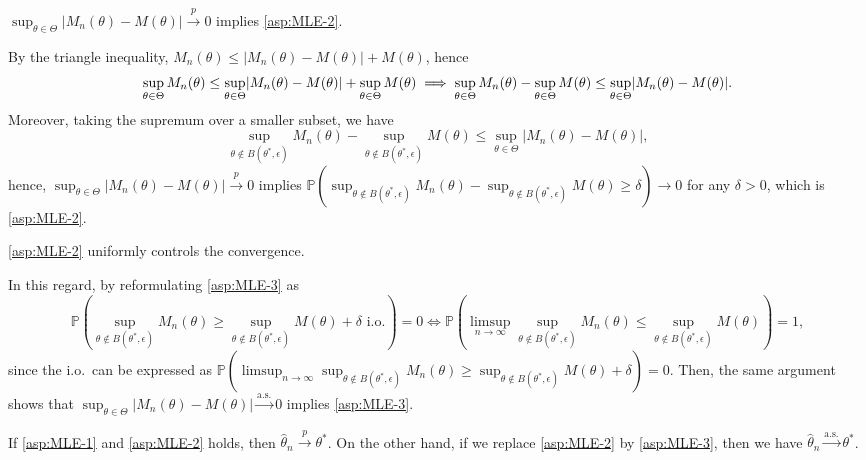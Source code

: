 \begin{claim}
	\(\sup _{\theta \in \Theta } \lvert M_n(\theta ) - M(\theta ) \rvert \overset{p}{\to} 0\) implies \autoref{asp:MLE-2}.
\end{claim}
\begin{explanation}
	By the triangle inequality, \(M_n(\theta ) \leq \lvert M_n(\theta ) - M(\theta ) \rvert + M(\theta )\), hence
	\[
		\sup _{\theta \in \Theta } M_n(\theta )
		\leq \sup _{\theta \in \Theta } \lvert M_n(\theta ) - M(\theta ) \rvert  + \sup _{\theta \in \Theta }M(\theta ) \\
		\implies \sup _{\theta \in \Theta } M_n(\theta ) - \sup _{\theta \in \Theta }M(\theta )
		\leq \sup _{\theta \in \Theta }\lvert M_n(\theta ) - M(\theta ) \rvert.
	\]
	Moreover, taking the supremum over a smaller subset, we have
	\[
		\sup _{\theta \notin B(\theta^{\ast}, \epsilon) } M_n(\theta ) - \sup _{\theta \notin B(\theta^{\ast}, \epsilon) }M(\theta )
		\leq \sup _{\theta \in \Theta }\lvert M_n(\theta ) - M(\theta ) \rvert,
	\]
	hence, \(\sup _{\theta \in \Theta } \lvert M_n(\theta ) - M(\theta ) \rvert \overset{p}{\to} 0\) implies \(\mathbb{P} ( \sup _{\theta \notin B(\theta ^{\ast} , \epsilon )} M_n(\theta ) - \sup _{\theta \notin B(\theta ^{\ast} , \epsilon )} M(\theta ) \geq \delta ) \to 0\) for any \(\delta > 0\), which is \autoref{asp:MLE-2}.
\end{explanation}

\begin{intuition}
	\autoref{asp:MLE-2} uniformly controls the convergence.
\end{intuition}

In this regard, by reformulating \autoref{asp:MLE-3} as
\[
	\mathbb{P} \left( \sup _{\theta \notin B(\theta ^{\ast} , \epsilon )} M_n(\theta ) \geq \sup _{\theta \notin B(\theta ^{\ast} , \epsilon )} M(\theta ) + \delta \text{ i.o.} \right) = 0
	\iff \mathbb{P} \left( \limsup_{n \to \infty} \sup _{\theta \notin B(\theta ^{\ast} , \epsilon )} M_n(\theta ) \leq \sup _{\theta \notin B(\theta ^{\ast} , \epsilon )} M(\theta ) \right) = 1,
\]
since the i.o.\ can be expressed as \(\mathbb{P} ( \limsup_{n \to \infty} \sup _{\theta \notin B(\theta ^{\ast} , \epsilon )} M_n(\theta ) \geq \sup _{\theta \notin B(\theta ^{\ast} , \epsilon )} M(\theta ) + \delta  ) = 0\). Then, the same argument shows that \(\sup _{\theta \in \Theta } \lvert M_n(\theta ) - M(\theta ) \rvert \overset{\text{a.s.} }{\to} 0\) implies \autoref{asp:MLE-3}.

\begin{theorem}\label{thm:M-estimator-consistency}
	If \autoref{asp:MLE-1} and \autoref{asp:MLE-2} holds, then \(\hat{\theta} _n \overset{p}{\to} \theta ^{\ast} \). On the other hand, if we replace \autoref{asp:MLE-2} by \autoref{asp:MLE-3}, then we have \(\hat{\theta} _n \overset{\text{a.s.} }{\to} \theta ^{\ast} \).
\end{theorem}
